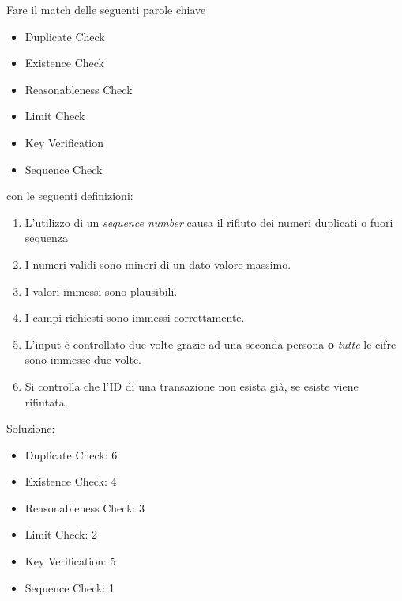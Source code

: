 \begin{Exercise} [
  title={Match definizioni},
  label={esCs7}
  ]

  \Question

  Fare il match delle seguenti parole chiave
  \begin{itemize}
   \item Duplicate Check
   \item Existence Check
   \item Reasonableness Check
   \item Limit Check
   \item Key Verification
   \item Sequence Check
  \end{itemize}

  con le seguenti definizioni:
  \begin{enumerate}
   \item L'utilizzo di un \textit{sequence number} causa il rifiuto
   dei numeri duplicati o fuori sequenza
   \item I numeri validi sono minori di un dato valore massimo.
   \item I valori immessi sono plausibili.
   \item I campi richiesti sono immessi correttamente.
   \item L'input è controllato due volte grazie ad una seconda persona
   \textbf{o} \emph{tutte} le cifre sono immesse due volte.
   \item Si controlla che l'ID di una transazione non esista già, se
   esiste viene rifiutata.
  \end{enumerate}

\end{Exercise}

\begin{Answer} [
  ref={esCs7},
  number={7}
  ]

  \Question Soluzione:
  \begin{itemize}
   \item Duplicate Check: 6
   \item Existence Check: 4
   \item Reasonableness Check: 3
   \item Limit Check: 2
   \item Key Verification: 5
   \item Sequence Check: 1
  \end{itemize}


\end{Answer}
